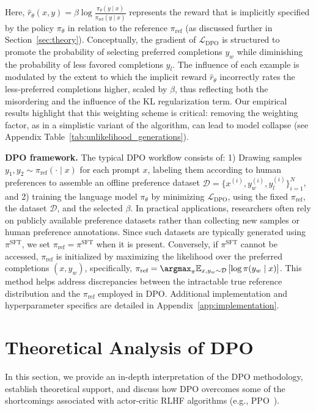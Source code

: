 Here, $\hat{r}_\theta(x, y) = \beta \log \frac{\pi_\theta(y \mid x)}{\pi_\text{ref}(y \mid x)}$ represents the reward that is implicitly specified by the policy $\pi_\theta$ in relation to the reference $\pi_\text{ref}$ (as discussed further in Section~\ref{sec:theory}). Conceptually, the gradient of $\mathcal{L}_\text{DPO}$ is structured to promote the probability of selecting preferred completions $y_w$ while diminishing the probability of less favored completions $y_l$. The influence of each example is modulated by the extent to which the implicit reward $\hat{r}_\theta$ incorrectly rates the less-preferred completions higher, scaled by $\beta$, thus reflecting both the misordering and the influence of the KL regularization term. Our empirical results highlight that this weighting scheme is critical: removing the weighting factor, as in a simplistic variant of the algorithm, can lead to model collapse (see Appendix Table~\ref{tab:unlikelihood_generations}).

\textbf{DPO framework.} The typical DPO workflow consists of: 1) Drawing samples $y_1, y_2 \sim \pi_\text{ref}(\cdot \mid x)$ for each prompt $x$, labeling them according to human preferences to assemble an offline preference dataset $\mathcal{D} = \{x^{(i)}, y_w^{(i)}, y_l^{(i)}\}_{i=1}^N$, and 2) training the language model $\pi_\theta$ by minimizing $\mathcal{L}_\text{DPO}$, using the fixed $\pi_\text{ref}$, the dataset $\mathcal{D}$, and the selected $\beta$. 
In practical applications, researchers often rely on publicly available preference datasets rather than collecting new samples or human preference annotations. Since such datasets are typically generated using $\pi^\text{SFT}$, we set $\pi_\text{ref} = \pi^\text{SFT}$ when it is present. Conversely, if $\pi^\text{SFT}$ cannot be accessed, $\pi_\text{ref}$ is initialized by maximizing the likelihood over the preferred completions ${(x, y_w)}$, specifically, ${\pi_\text{ref} = \argmax_{\pi}\mathbb{E}_{x, y_w \sim \mathcal{D}}\left[\log \pi(y_w \mid x)\right]}$. This method helps address discrepancies between the intractable true reference distribution and the $\pi_\text{ref}$ employed in DPO. Additional implementation and hyperparameter specifics are detailed in Appendix~\ref{app:implementation}.

\section{Theoretical Analysis of DPO} In this section, we provide an in-depth interpretation of the DPO methodology, establish theoretical support, and discuss how DPO overcomes some of the shortcomings associated with actor-critic RLHF algorithms (e.g., PPO~\cite{schulman2017proximal}).

